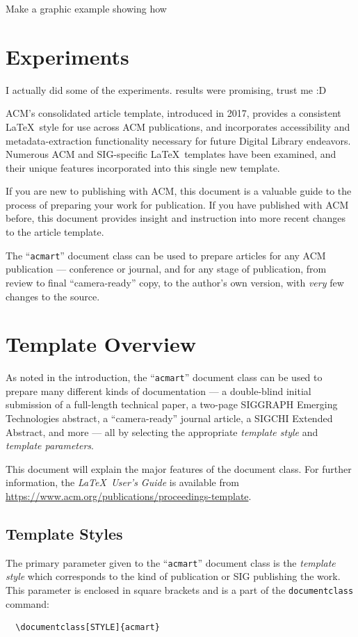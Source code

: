 \documentclass[manuscript,screen,review]{acmart}
\theoremstyle{definition}
\begin{document}
Make a graphic example showing how

\section{Experiments}

I actually did some of the experiments. results were promising, trust me :D


ACM's consolidated article template, introduced in 2017, provides a
consistent \LaTeX\ style for use across ACM publications, and
incorporates accessibility and metadata-extraction functionality
necessary for future Digital Library endeavors. Numerous ACM and
SIG-specific \LaTeX\ templates have been examined, and their unique
features incorporated into this single new template.

If you are new to publishing with ACM, this document is a valuable
guide to the process of preparing your work for publication. If you
have published with ACM before, this document provides insight and
instruction into more recent changes to the article template.

The ``\verb|acmart|'' document class can be used to prepare articles
for any ACM publication --- conference or journal, and for any stage
of publication, from review to final ``camera-ready'' copy, to the
author's own version, with {\itshape very} few changes to the source.

\section{Template Overview}
As noted in the introduction, the ``\verb|acmart|'' document class can
be used to prepare many different kinds of documentation --- a
double-blind initial submission of a full-length technical paper, a
two-page SIGGRAPH Emerging Technologies abstract, a ``camera-ready''
journal article, a SIGCHI Extended Abstract, and more --- all by
selecting the appropriate {\itshape template style} and {\itshape
		template parameters}.

This document will explain the major features of the document
class. For further information, the {\itshape \LaTeX\ User's Guide} is
available from
\url{https://www.acm.org/publications/proceedings-template}.

\subsection{Template Styles}

The primary parameter given to the ``\verb|acmart|'' document class is
the {\itshape template style} which corresponds to the kind of publication
or SIG publishing the work. This parameter is enclosed in square
brackets and is a part of the {\verb|documentclass|} command:
\begin{verbatim}
  \documentclass[STYLE]{acmart}
\end{verbatim}
\end{document}
